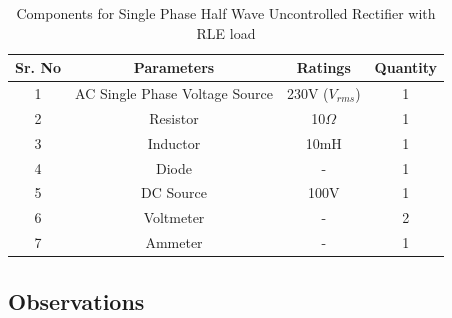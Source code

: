 \begin{table}[h]
    \renewcommand{\arraystretch}{1.3}
    \label{table_components_required_single-phase-half-wave-uncontrolled-rectifier-with-RLE-load}
    \centering
    \begin{tabular}{|c|c|c|c|}
        \hline
        Sr. No & Parameters                     & Ratings            & Quantity \\
        \hline
        \hline
        1      & AC Single Phase Voltage Source & 230V ($ V_{rms} $) & 1        \\
        \hline
        2      & Resistor                       & 10$ \Omega $       & 1        \\
        \hline
        3      & Inductor                       & 10mH               & 1        \\
        \hline
        4      & Diode                          & -                  & 1        \\
        \hline
        5      & DC Source                      & 100V               & 1        \\
        \hline
        6      & Voltmeter                      & -                  & 2        \\
        \hline
        7      & Ammeter                        & -                  & 1        \\
        \hline
    \end{tabular}
    \caption{Components for Single Phase Half Wave Uncontrolled Rectifier with RLE load}
\end{table}




\subsection{Observations}

